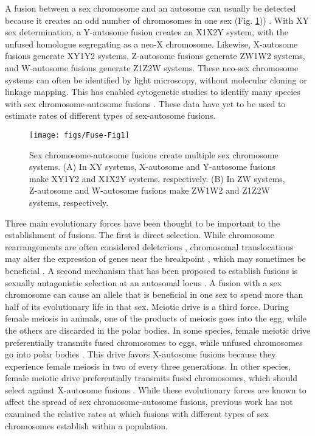 A fusion between a sex chromosome and an autosome can usually be detected because it creates an odd number of chromosomes in one sex (Fig. \ref{fig:fuse-diag})) \citep{White1971, Ohno1967}. With XY sex determination, a Y-autosome fusion creates an X1X2Y system, with the unfused homologue segregating as a neo-X chromosome. Likewise, X-autosome fusions generate XY1Y2 systems, Z-autosome fusions generate ZW1W2 systems, and W-autosome fusions generate Z1Z2W systems. These neo-sex chromosome systems can often be identified by light microscopy, without molecular cloning or linkage mapping. This has enabled cytogenetic studies to identify many species with sex chromosome-autosome fusions \citep{White1971, Ezaz2009, Kitano2012, Yoshida2012, Maddison2013}. These data have yet to be used to estimate rates of different types of sex-autosome fusions.

\begin{figure}
\centering
\texttt{[image: figs/Fuse-Fig1]}
\caption[Schematic of sex chromosome fusions]{Sex chromosome-autosome fusions create multiple sex chromosome systems. (A) In XY systems, X-autosome and Y-autosome fusions make XY1Y2 and X1X2Y systems, respectively. (B) In ZW systems, Z-autosome and W-autosome fusions make ZW1W2 and Z1Z2W systems, respectively.}
\label{fig:fuse-diag}
\end{figure}

Three main evolutionary forces have been thought to be important to the establishment of fusions. The first is direct selection. While chromosome rearrangements are often considered deleterious \citep{King1993, Gardner2012}, chromosomal translocations may alter the expression of genes near the breakpoint \citep{Ohno1967, Dobigny2004}, which may sometimes be beneficial \citep{PerezOrtin2002, Chang2013}. A second mechanism that has been proposed to establish fusions is sexually antagonistic selection at an autosomal locus \citep{Charlesworth1982}. A fusion with a sex chromosome can cause an allele that is beneficial in one sex to spend more than half of its evolutionary life in that sex. Meiotic drive is a third force. During female meiosis in animals, one of the products of meiosis goes into the egg, while the others are discarded in the polar bodies. In some species, female meiotic drive preferentially transmits fused chromosomes to eggs, while unfused chromosomes go into polar bodies \citep{Pardo2001a, Pardo2001b}. This drive favors X-autosome fusions because they experience female meiosis in two of every three generations. In other species, female meiotic drive preferentially transmits fused chromosomes, which should select against X-autosome fusions \citep{Yoshida2012}. While these evolutionary forces are known to affect the spread of sex chromosome-autosome fusions, previous work has not examined the relative rates at which fusions with different types of sex chromosomes establish within a population.
 
